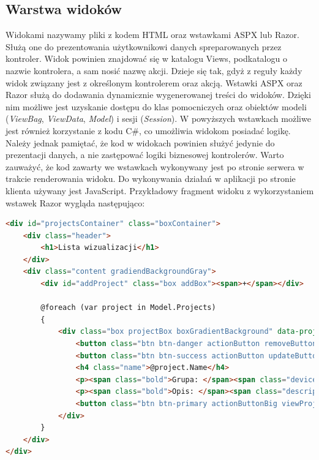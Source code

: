 \subsection{Warstwa widoków}
Widokami nazywamy pliki z kodem HTML oraz wstawkami ASPX lub Razor. Służą one do prezentowania użytkownikowi danych spreparowanych przez kontroler. Widok powinien znajdować się w katalogu Views, podkatalogu o nazwie kontrolera, a sam nosić nazwę akcji. Dzieje się tak, gdyż z reguły każdy widok związany jest z określonym kontrolerem oraz akcją. 
Wstawki ASPX oraz Razor służą do dodawania dynamicznie wygenerowanej treści do widoków. Dzięki nim możliwe jest uzyskanie dostępu do klas pomocniczych oraz obiektów modeli (\textit{ViewBag}, \textit{ViewData}, \textit{Model}) i sesji (\textit{Session}). W powyższych wstawkach możliwe jest również korzystanie z kodu C\#, co umożliwia widokom posiadać logikę. Należy jednak pamiętać, że kod w widokach powinien służyć jedynie do prezentacji danych, a nie zastępować logiki biznesowej kontrolerów. Warto zauważyć, że kod zawarty we wstawkach wykonywany jest po stronie serwera w trakcie renderowania widoku. Do wykonywania działań w aplikacji po stronie klienta używany jest JavaScript. Przykładowy fragment widoku z wykorzystaniem wstawek Razor wygląda następująco:

\begin{lstlisting}[language=HTML]
<div id="projectsContainer" class="boxContainer">
    <div class="header">
        <h1>Lista wizualizacji</h1>
    </div>
    <div class="content gradiendBackgroundGray">
        <div id="addProject" class="box addBox"><span>+</span></div>

        @foreach (var project in Model.Projects)
        {
            <div class="box projectBox boxGradientBackground" data-projectname="@project.Name" data-projectid="@project.Id">
                <button class="btn btn-danger actionButton removeButton"><span class="glyphicon glyphicon-remove"></span></button>
                <button class="btn btn-success actionButton updateButton"><span class="glyphicon glyphicon-pencil"></span></button>
                <h4 class="name">@project.Name</h4>
                <p><span class="bold">Grupa: </span><span class="deviceSchemeName">@project.DeviceScheme.Name</span></p>
                <p><span class="bold">Opis: </span><span class="description">@project.Description</span></p>
                <button class="btn btn-primary actionButtonBig viewProjectButton"><span class=" glyphicon glyphicon-search"></span></button>
            </div>
        }
    </div>
</div>
\end{lstlisting}

